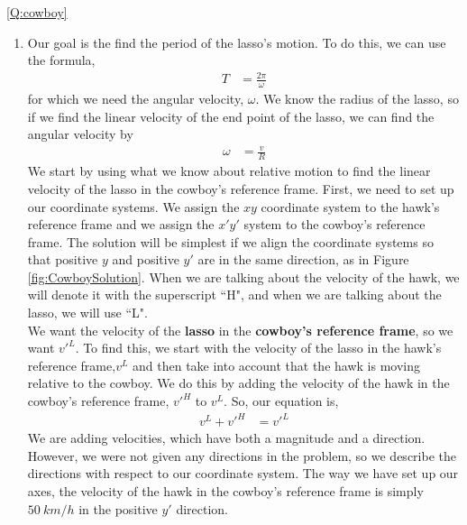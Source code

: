 \newpage
\begin{solution}{\ref{Q:cowboy}}{
\begin{enumerate}[label=\alph*)]
\item Our goal is the find the period of the lasso's motion. To do this, we can use the formula, 
\begin{align*}
T&=\frac{2\pi}{\omega}
\end{align*}
for which we need the angular velocity, $\omega$. We know the radius of the lasso, so if we find the linear velocity of the end point of the lasso, we can find the angular velocity by
\begin{align*}
\omega&=\frac{v}{R}
\end{align*}
We start by using what we know about relative motion to find the linear velocity of the lasso in the cowboy's reference frame. First, we need to set up our coordinate systems. We assign the $xy$ coordinate system to the hawk's reference frame and we assign the $x'y'$ system to the cowboy's reference frame. The solution will be simplest if we align the coordinate systems so that positive $y$ and positive $y'$ are in the same direction, as in Figure \ref{fig:CowboySolution}. When we are talking about the velocity of the hawk, we will denote it with the superscript ``H", and when we are talking about the lasso, we will use ``L".\\

We want the velocity of the \textbf{lasso} in the \textbf{cowboy's reference frame}, so we want $v'^L$. To find this, we start with the velocity of the lasso in the hawk's reference frame,$v^L$ and then take into account that the hawk is moving relative to the cowboy. We do this by adding the velocity of the hawk in the cowboy's reference frame, $v'^H$ to $v^L$. So, our equation is,
\begin{align*}
v^L+v'^H&=v'^L
\end{align*}
We are adding velocities, which have both a magnitude and a direction. However, we were not given any directions in the problem, so we describe the directions with respect to our coordinate system. The way we have set up our axes, the velocity of the hawk in the cowboy's reference frame is simply $\SI{50}{km/h}$ in the positive $y'$ direction.\\


\end{enumerate}}
\end{solution}
